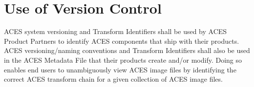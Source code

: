 \regularsectionformat
\chapter{Use of Version Control}

ACES system versioning and Transform Identifiers shall be used by ACES Product Partners to identify ACES components that ship with their products. ACES versioning/naming conventions and Transform Identifiers shall also be used in the ACES Metadata File that their products create and/or modify. Doing so enables end users to unambiguously view ACES image files by identifying the correct ACES transform chain for a given collection of ACES image files.